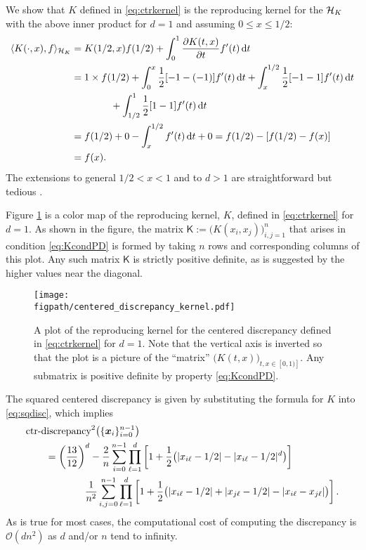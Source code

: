 \documentclass{svproc}
\newcommand{\figpath}{Figures}
\begin{document}
We show that $K$ defined in \eqref{eq:ctrkernel} is the reproducing kernel for the ${\mathcal{H}}_K$ with the above inner product for $d=1$ and assuming $0 \le x \le 1/2$:
\begin{align*}
	\langle K(\cdot,x), f \rangle_{{\mathcal{H}}_K}
	& =
	K(1/2,x) f(1/2) + \int_0^1 \frac{\partial K(t,x)}{\partial t} f'(t) \, \mathrm{d} t \\
	& = 1 \times f(1/2) +  \int_0^x \frac 12 [-1  - (-1) ] f'(t) \, \mathrm{d} t +
	\int_x^{1/2} \frac 12 [-1  - 1 ] f'(t) \, \mathrm{d} t \\
	& \qquad \qquad +
	\int_{1/2}^{1} \frac 12 [1  - 1 ] f'(t) \, \mathrm{d} t \\
	& = f(1/2) + 0 - \int_x^{1/2} f'(t) \, \mathrm{d} t + 0 = f(1/2) - [f(1/2) - f(x)] \\
	& =  f(x).
\end{align*}
The extensions to general $1/2 < x < 1$ and to $d > 1$ are straightforward but tedious \cite{Hic97a}.

Figure \ref{fig:ctrKer} is a color map of the reproducing kernel, $K$, defined in \eqref{eq:ctrkernel} for $d=1$.  As shown in the figure, the matrix $\mathsf{K} := \bigl( K(x_i,x_j) \bigr)_{i,j=1}^n$ that arises in condition \eqref{eq:KcondPD} is formed by taking $n$ rows and corresponding columns of this plot.  Any such matrix $\mathsf{K}$ is strictly positive definite, as is suggested by the higher values near the diagonal.

\begin{figure}
	\centering
	\texttt{[image: \\figpath/centered\_discrepancy\_kernel.pdf]}
	\caption{A plot of the reproducing kernel for the centered discrepancy defined in \eqref{eq:ctrkernel} for $d=1$.  Note that the vertical axis is inverted so that the plot is a picture of the ``matrix'' $\bigl( K(t,x) \bigr)_{t,x \in [0,1)]}$.  Any submatrix is positive definite by property \eqref{eq:KcondPD}. \label{fig:ctrKer}}
\end{figure}

The squared centered discrepancy is given by substituting the formula for $K$ into \eqref{eq:sqdisc}, which implies
\begin{align} \label{eq:ctrdisc}
	\nonumber
	\MoveEqLeft\text{ctr-discrepancy}^2\bigl(\{ \bsx_i\}_{i=0}^{n-1} \bigr) \\
	\nonumber
	&= \left ( \frac{13}{12} \right )^d
	- \frac 2n \sum_{i=0}^{n-1} \prod_{\ell=1}^d \left [ 1 + \frac 12 \bigl ( \lvert x_{i\ell} - 1/2 \rvert - \lvert x_{i\ell} - 1/2 \rvert^d \bigr )\right ] \\
	& \qquad \qquad \frac{1}{n^2} \sum_{i,j=0}^{n-1} \prod_{\ell = 1}^d \left[ 1 + \frac 12 \bigl ( \lvert x_{i\ell} - 1/2 \rvert + \lvert x_{j\ell} - 1/2 \rvert - \lvert x_{i\ell} - x_{j\ell} \rvert \bigr ) \right].
\end{align}
As is true for most cases, the computational cost of computing the discrepancy is $\mathcal{O}(dn^2)$ as $d$ and/or $n$ tend to infinity.
\end{document}
